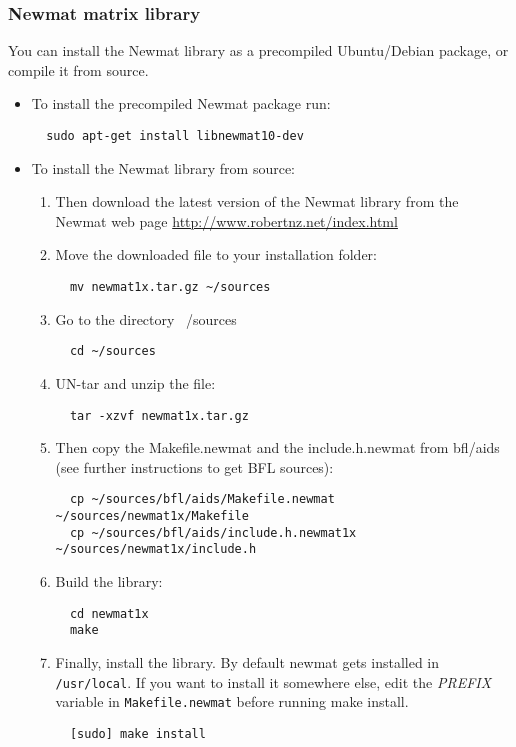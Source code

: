 \documentclass[a4paper,10pt]{article}
\begin{document}
\subsubsection{Newmat matrix library}
You can install the Newmat library as a precompiled Ubuntu/Debian
package, or compile it from source.
\begin{itemize}
\item To install the precompiled Newmat package run:
\begin{verbatim}
  sudo apt-get install libnewmat10-dev
\end{verbatim}


\item To install the Newmat library from source:
\begin{enumerate}
\item Then download the latest version of the Newmat library from the
  Newmat web page
  \url{http://www.robertnz.net/index.html}
\item Move the downloaded file to your installation folder:
\begin{verbatim}
  mv newmat1x.tar.gz ~/sources
\end{verbatim}
\item Go to the directory ~/sources
\begin{verbatim}
  cd ~/sources
\end{verbatim}
\item UN-tar and unzip the file:
\begin{verbatim}
  tar -xzvf newmat1x.tar.gz
\end{verbatim}
\item Then copy the Makefile.newmat and the include.h.newmat from
  bfl/aids (see further instructions to get BFL sources):
\begin{verbatim}
  cp ~/sources/bfl/aids/Makefile.newmat ~/sources/newmat1x/Makefile
  cp ~/sources/bfl/aids/include.h.newmat1x ~/sources/newmat1x/include.h
\end{verbatim}
\item Build the library:
\begin{verbatim}
  cd newmat1x
  make 
\end{verbatim}
\item Finally, install the library.  By default newmat gets installed
  in \texttt{/usr/local}.  If you want to install it somewhere else,
  edit the \emph{PREFIX} variable in \texttt{Makefile.newmat} before
  running make install.
\begin{verbatim}
  [sudo] make install
\end{verbatim}
\end{enumerate}
\end{itemize}
\end{document}
